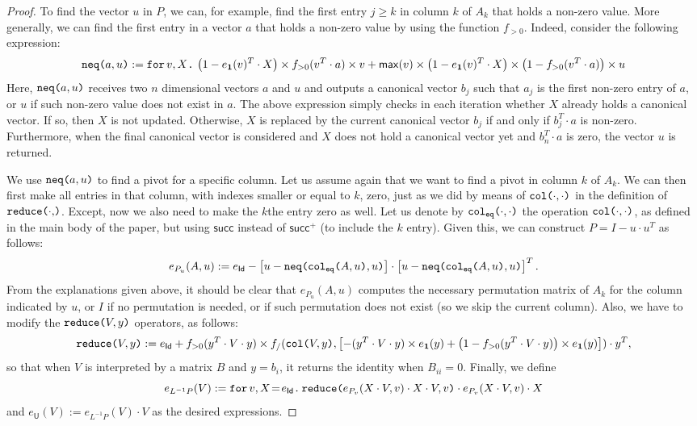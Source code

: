 \begin{proof}
To find the vector $u$ in $P$, we can, for example, find the first entry $j\geq k$ in column $k$ of $A_k$ that holds a non-zero value. More generally, we can find the first entry in a vector $a$ that holds a non-zero value by using the function $f_{>0}$. Indeed, consider the following expression:
$$
\nneq{a}{u}:=\ffor{v}{X}{\left( 1-e_{\ones}(v)^T\cdot X \right) \times f_{>0}(v^T\cdot a)\times v + \mathsf{max}(v)\times\left( 1-e_{\ones}(v)^T\cdot X \right)\times \left( 1 - f_{>0}(v^T\cdot a) \right) \times u}
$$
Here, $\nneq{a}{u}$ receives two $n$ dimensional vectors $a$ and $u$ and outputs a 
canonical vector $b_j$ such that $a_j$ is the first non-zero entry of $a$, or $u$ if such non-zero value does not exist in $a$. The above expression simply checks in each iteration
whether $X$ already holds a canonical vector. If so, then $X$ is not updated. Otherwise,
$X$ is replaced by the current canonical vector $b_j$ if and only if $b_j^T\cdot a$ is non-zero. Furthermore, when the final canonical vector is considered and $X$ does not hold
a canonical vector yet and $b_n^T\cdot a$ is zero, the vector $u$ is returned.

We use $\nneq{a}{u}$ to find a pivot for a specific column. Let us assume again that we
want to find a pivot in column $k$ of $A_k$. We can then first make all entries in that column, with indexes smaller or equal to $k$, zero, just as we did by means of $\ccol{\cdot}{\cdot}$ in the
definition of $\red{\cdot}$. Except, now we also need to make the $k$the entry zero as well.
Let us denote by $\ccoleq{\cdot}{\cdot}$ the operation $\ccol{\cdot}{\cdot}$, as defined in the main body of the paper, but using $\mathsf{succ}$ instead of $\mathsf{succ}^+$ (to include the $k$ entry). Given this, we can construct $P=I-u\cdot u^T$ as follows:
$$
e_{P_u}(A,u) := e_{\mathsf{Id}} - \left[ u - \nneq{ \ccoleq{A}{u} }{u} \right]\cdot \left[ u - \nneq{ \ccoleq{A}{u} }{u} \right]^T.
$$ 
From the explanations given above, it should be clear that $e_{P_u}(A,u)$ computes the necessary permutation matrix of $A_k$ for the column indicated by $u$, or $I$
if no permutation is needed, or if such permutation does not exist (so we skip the current column). Also, we have to modify the $\red{V}{y}$ operators, as follows:
$$
\red{V}{y}:= e_{\mathsf{Id}}+ f_{>0}(y^T\cdot V\cdot y)\times f_/(\ccol{V}{y},\left[ -(y^T\cdot V\cdot y)\times e_{\ones}(y) + \left( 1 - f_{>0}(y^T\cdot V\cdot y) \right)\times e_{\ones}(y) \right])\cdot y^T,
$$
so that when $V$ is interpreted by a  matrix $B$ and $y=b_i$, it returns the identity when $B_{ii}=0$.
Finally, we define
$$
e_{L^{-1}P}(V):=\initf{e_{\mathsf{Id}}}{v}{X}{\red{e_{P_v}(X\cdot V,v)\cdot X\cdot V}{v}\cdot e_{P_v}(X\cdot V,v)\cdot X}
$$
and $e_{\mathsf{U}}(V):=e_{L^{-1}P}(V)\cdot V$ as the desired expressions.


\end{proof}
